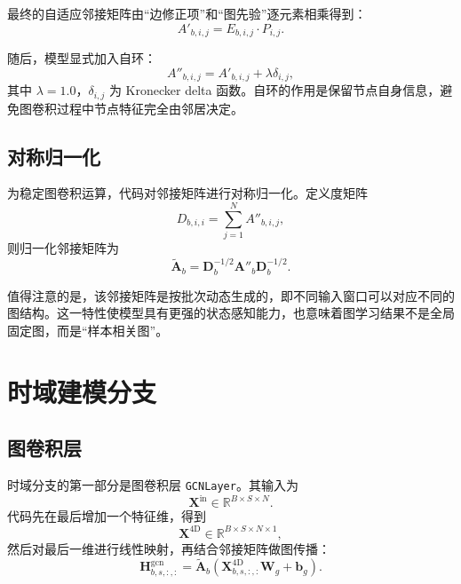 最终的自适应邻接矩阵由“边修正项”和“图先验”逐元素相乘得到：
\begin{equation}
    A'_{b,i,j} = E_{b,i,j} \cdot P_{i,j}.
\end{equation}

随后，模型显式加入自环：
\begin{equation}
    A''_{b,i,j} = A'_{b,i,j} + \lambda \delta_{i,j},
\end{equation}
其中 $\lambda=1.0$，$\delta_{i,j}$ 为 Kronecker delta 函数。自环的作用是保留节点自身信息，避免图卷积过程中节点特征完全由邻居决定。

\subsection{对称归一化}

为稳定图卷积运算，代码对邻接矩阵进行对称归一化。定义度矩阵
\begin{equation}
    D_{b,i,i} = \sum_{j=1}^{N} A''_{b,i,j},
\end{equation}
则归一化邻接矩阵为
\begin{equation}
    \tilde{\mathbf{A}}_b = \mathbf{D}_b^{-1/2}\mathbf{A}''_b\mathbf{D}_b^{-1/2}.
\end{equation}

值得注意的是，该邻接矩阵是按批次动态生成的，即不同输入窗口可以对应不同的图结构。这一特性使模型具有更强的状态感知能力，也意味着图学习结果不是全局固定图，而是“样本相关图”。

\section{时域建模分支}

\subsection{图卷积层}

时域分支的第一部分是图卷积层 \texttt{GCNLayer}。其输入为
\begin{equation}
    \mathbf{X}^{\mathrm{in}} \in \mathbb{R}^{B \times S \times N}.
\end{equation}
代码先在最后增加一个特征维，得到
\begin{equation}
    \mathbf{X}^{4\mathrm{D}} \in \mathbb{R}^{B \times S \times N \times 1},
\end{equation}
然后对最后一维进行线性映射，再结合邻接矩阵做图传播：
\begin{equation}
    \mathbf{H}^{\mathrm{gcn}}_{b,s,:,:}
    = \tilde{\mathbf{A}}_b
    \left(
        \mathbf{X}^{4\mathrm{D}}_{b,s,:,:}\mathbf{W}_g + \mathbf{b}_g
    \right).
\end{equation}

